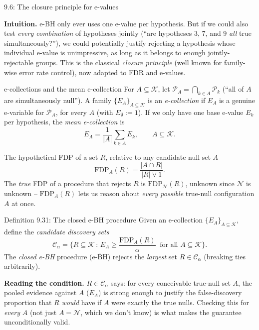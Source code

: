 \documentclass[aspectratio=169,10pt]{beamer}
\newcommand{\Kc}{\mathcal{K}}
\newcommand{\Nc}{\mathcal{N}}
\begin{document}
\begin{frame}[allowframebreaks]{9.6: The closure principle for e-values}

\textbf{Intuition.} e-BH only ever uses one e-value per hypothesis. But if we could also test \emph{every combination} of hypotheses jointly (``are hypotheses 3, 7, and 9 \emph{all} true simultaneously?''), we could potentially justify rejecting a hypothesis whose individual e-value is unimpressive, as long as it belongs to enough jointly-rejectable groups. This is the classical \emph{closure principle} (well known for family-wise error rate control), now adapted to FDR and e-values.

\begin{block}{e-collections and the mean e-collection}
For $A\subseteq\Kc$, let $\mathcal{P}_A = \bigcap_{k\in A}\mathcal{P}_k$ (``all of $A$ are simultaneously null''). A family $\{E_A\}_{A\subseteq\Kc}$ is an \emph{e-collection} if $E_A$ is a genuine e-variable for $\mathcal{P}_A$, for every $A$ (with $E_\emptyset:=1$). If we only have one base e-value $E_k$ per hypothesis, the \emph{mean e-collection} is
\[
E_A = \frac{1}{|A|}\sum_{k\in A} E_k, \qquad A\subseteq\Kc.
\]
\end{block}

\begin{block}{The hypothetical FDP of a set $R$, relative to any candidate null set $A$}
\[
\text{FDP}_A(R) = \frac{|A\cap R|}{|R|\vee 1}.
\]
The \emph{true} FDP of a procedure that rejects $R$ is $\text{FDP}_{\Nc}(R)$, unknown since $\Nc$ is unknown -- $\text{FDP}_A(R)$ lets us reason about \emph{every possible} true-null configuration $A$ at once.
\end{block}

\framebreak

\begin{block}{Definition 9.31: The closed e-BH procedure}
Given an e-collection $\{E_A\}_{A\subseteq\Kc}$, define the \emph{candidate discovery sets}
\[
\mathcal{C}_\alpha = \Big\{ R\subseteq\Kc \,:\, E_A \ge \frac{\text{FDP}_A(R)}{\alpha} \ \text{ for all } A\subseteq\Kc \Big\}.
\]
The \emph{closed e-BH} procedure ($\overline{\text{e-BH}}$) rejects the \emph{largest} set $R\in\mathcal{C}_\alpha$ (breaking ties arbitrarily).
\end{block}
\textbf{Reading the condition.} $R\in\mathcal{C}_\alpha$ says: for every conceivable true-null set $A$, the pooled evidence against $A$ ($E_A$) is strong enough to justify the false-discovery proportion that $R$ \emph{would} have if $A$ were exactly the true nulls. Checking this for \emph{every} $A$ (not just $A=\Nc$, which we don't know) is what makes the guarantee unconditionally valid.


\end{frame}
\end{document}
